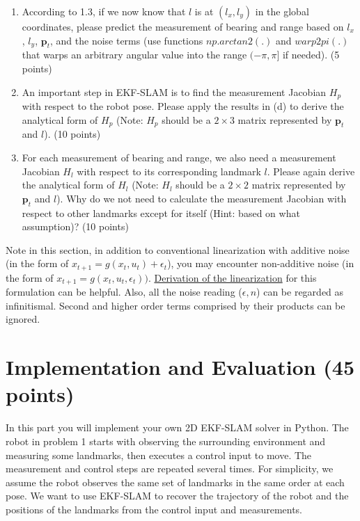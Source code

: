 \documentclass[12pt, a4paper]{article}
\begin{document}
\begin{enumerate}
\item According to 1.3, if we now know that $l$ is at $\left(l_{x},l_{y}\right)$
in the global coordinates, please predict the measurement of bearing
and range based on $l_{x}$, $l_{y}$, $\mathbf{p}_{t}$, and the
noise terms (use functions $\mathit{np.arctan2}(.)$ and $\mathit{warp2pi}(.)$
that warps an arbitrary angular value into the range $(-\pi,\pi]$
if needed). (5 points)

\item An important step in EKF-SLAM is to find the measurement Jacobian
$H_{p}$ with respect to the robot pose. Please apply the results
in (d) to derive the analytical form of $H_{p}$ (Note: $H_{p}$ should
be a $2\times3$ matrix represented by $\mathbf{p}_{t}$ and $l$).
(10 points)

\item For each measurement of bearing and range, we also need a measurement
Jacobian $H_{l}$ with respect to its corresponding landmark $l$.
Please again derive the analytical form of $H_{l}$ (Note: $H_{l}$
should be a $2\times2$ matrix represented by $\mathbf{p}_{t}$ and
$l$). Why do we not need to calculate the measurement Jacobian with
respect to other landmarks except for itself (Hint: based on what
assumption)? (10 points)
\end{enumerate}

Note in this section, in addition to conventional linearization with additive noise (in the form of $x_{t+1} = g(x_t, u_t) + \epsilon_t$), you may encounter non-additive noise (in the form of $x_{t+1} = g(x_t, u_t, \epsilon_t))$. \href{https://en.wikipedia.org/wiki/Extended_Kalman_filter#Non-additive_noise_formulation_and_equations}{Derivation of the linearization} for this formulation can be helpful.
Also, all the noise reading ($\epsilon, n$) can be regarded as infinitismal. Second and higher order terms comprised by their products can be ignored.

\section{Implementation and Evaluation (45 points)}

In this part you will implement your own 2D EKF-SLAM solver in Python.
The robot in problem 1 starts with observing the surrounding environment
and measuring some landmarks, then executes a control input to move.
The measurement and control steps are repeated several times. For
simplicity, we assume the robot observes the same set of landmarks
in the same order at each pose. We want to use EKF-SLAM to recover
the trajectory of the robot and the positions of the landmarks from
the control input and measurements. 
\end{document}
